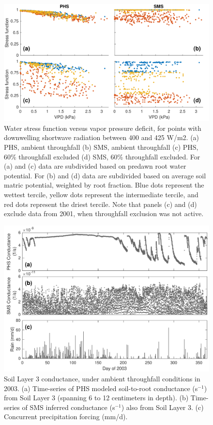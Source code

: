 \documentclass[draft,linenumbers]{agujournal}
\begin{document}
      \clearpage
    \begin{figure}[h]
     \centering
     \includegraphics[width=30pc]{../figs2/fig5.pdf}
     \caption{Water stress function versus vapor pressure deficit, for points with downwelling shortwave radiation between 400 and 425 W/m2.
     (a) PHS, ambient throughfall
     (b) SMS, ambient throughfall
     (c) PHS, 60\% throughfall excluded
     (d) SMS, 60\% throughfall excluded. 
     For (a) and (c) data are subdivided based on predawn root water potential.
     For (b) and (d) data are subdivided based on average soil matric potential, weighted by root fraction.
     Blue dots represent the wettest tercile, yellow dots represent the intermediate tercile, and red dots represent the driest tercile.
     Note that panels (c) and (d) exclude data from 2001, when throughfall exclusion was not active.
     }
     \label{fig5}
       \end{figure}
  
  
\clearpage   
  \begin{figure}[h]
     \centering
     \includegraphics[width=30pc]{../figs2/fig6.pdf}
     \caption{Soil Layer 3 conductance, under ambient throughfall conditions in 2003. 
     (a) Time-series of PHS modeled soil-to-root conductance (s$^{-1}$) from Soil Layer 3 (spanning 6 to 12 centimeters in depth).
     (b) Time-series of SMS inferred conductance (s$^{-1}$) also from Soil Layer 3.
     (c) Concurrent precipitation forcing (mm/d).
     }
     \label{fig:cond}
  \end{figure}
  
\end{document}
